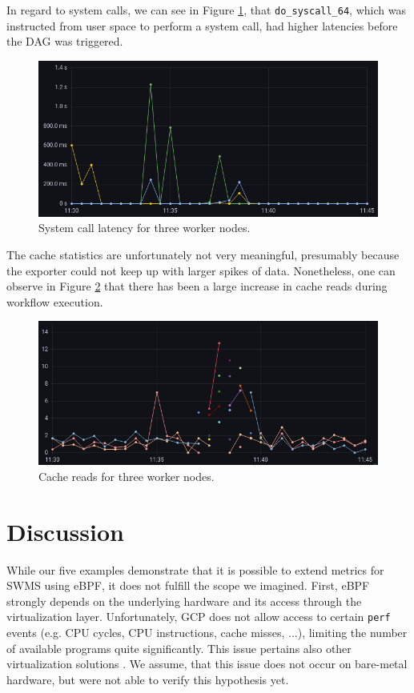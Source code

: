 \documentclass[lettersize,journal]{IEEEtran}
\begin{document}
	In regard to system calls, we can see in Figure \ref{fig:results:syscalls}, that \texttt{do\_syscall\_64}, which was instructed from user space to perform a system call, had higher latencies before the DAG was triggered.
	\begin{figure}[h]
		\includegraphics[width=\linewidth]{images/results_syscalls_total.png}
		\caption{System call latency for three worker nodes.}
		\label{fig:results:syscalls}
	\end{figure}
	
	The cache statistics are unfortunately not very meaningful, presumably because the exporter could not keep up with larger spikes of data. Nonetheless, one can observe in Figure \ref{fig:results:cachestat} that there has been a large increase in cache reads during workflow execution.
	\begin{figure}[h]
		\includegraphics[width=\linewidth]{images/results_cachestat_access.png}
		\caption{Cache reads for three worker nodes.}
		\label{fig:results:cachestat}
	\end{figure}
	
	\section{Discussion}
	While our five examples demonstrate that it is possible to extend metrics for SWMS using eBPF, it does not fulfill the scope we imagined.
	First, eBPF strongly depends on the underlying hardware and its access through the virtualization layer. Unfortunately, GCP does not allow access to certain \texttt{perf} events (e.g. CPU cycles, CPU instructions, cache misses, ...), limiting the number of available programs quite significantly. This issue pertains also other virtualization solutions \cite{ebpfVirtIssue1}\cite{ebpfVirtIssue2}\cite{ebpfVirtIssue3}. We assume, that this issue does not occur on bare-metal hardware, but were not able to verify this hypothesis yet.
	
\end{document}
